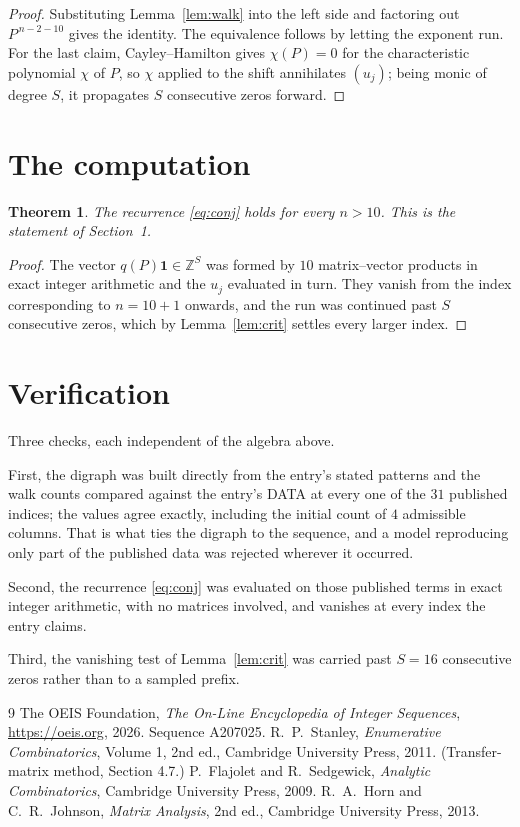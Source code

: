 \documentclass[11pt,a4paper]{article}
\theoremstyle{plain}
\newtheorem{theorem}{Theorem}
\theoremstyle{definition}
\begin{document}
\begin{proof}
Substituting Lemma~\ref{lem:walk} into the left side and factoring out
$P^{\,n-2-10}$ gives the identity. The equivalence follows by letting the exponent
run. For the last claim, Cayley--Hamilton gives $\chi(P)=0$ for the characteristic
polynomial $\chi$ of $P$, so $\chi$ applied to the shift annihilates $(u_j)$; being monic of
degree $S$, it propagates $S$ consecutive zeros forward.
\end{proof}

\section{The computation}

\begin{theorem}
The recurrence \eqref{eq:conj} holds for every $n>10$. This is the statement of
Section~1.
\end{theorem}

\begin{proof}
The vector $q(P)\mathbf{1}\in\mathbb{Z}^{S}$ was formed by $10$ matrix--vector
products in exact integer arithmetic and the $u_j$ evaluated in turn. They vanish from the
index corresponding to $n=10+1$ onwards, and the run was continued past $S$ consecutive
zeros, which by Lemma~\ref{lem:crit} settles every larger index.
\end{proof}

\section{Verification}

Three checks, each independent of the algebra above.

First, the digraph was built directly from the entry's stated patterns and the walk counts
compared against the entry's DATA at every one of the $31$ published indices; the
values agree exactly, including the initial count of $4$ admissible columns. That is
what ties the digraph to the sequence, and a model reproducing only part of the published
data was rejected wherever it occurred.

Second, the recurrence \eqref{eq:conj} was evaluated on those published terms in exact
integer arithmetic, with no matrices involved, and vanishes at every index the entry claims.

Third, the vanishing test of Lemma~\ref{lem:crit} was carried past $S=16$ consecutive
zeros rather than to a sampled prefix.

\begin{thebibliography}{9}
 The OEIS Foundation, \emph{The On-Line Encyclopedia of Integer
Sequences}, \url{https://oeis.org}, 2026. Sequence A207025.
 R.~P.~Stanley, \emph{Enumerative Combinatorics}, Volume 1, 2nd ed.,
Cambridge University Press, 2011. (Transfer-matrix method, Section 4.7.)
 P.~Flajolet and R.~Sedgewick, \emph{Analytic Combinatorics}, Cambridge
University Press, 2009.
 R.~A.~Horn and C.~R.~Johnson, \emph{Matrix Analysis}, 2nd ed., Cambridge
University Press, 2013.
\end{thebibliography}
\end{document}
